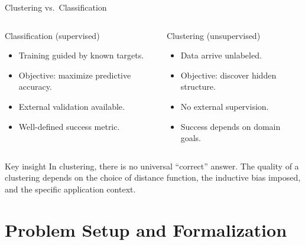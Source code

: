 \begin{frame}{Clustering vs.\ Classification}
  \begin{columns}[t]
      \begin{block}{Classification (supervised)}
        \begin{itemize}
          \item Training guided by \alert{known targets}.
          \item Objective: maximize predictive accuracy.
          \item External validation available.
          \item Well-defined success metric.
        \end{itemize}
      \end{block}
      \begin{block}{Clustering (unsupervised)}
        \begin{itemize}
          \item Data arrive \alert{unlabeled}.
          \item Objective: discover hidden structure.
          \item No external supervision.
          \item Success depends on domain goals.
        \end{itemize}
      \end{block}
  \end{columns}
  \vspace{0.6em}
  \begin{alertblock}{Key insight}
    In clustering, there is no universal ``correct'' answer. The quality of a clustering
    depends on the choice of distance function, the inductive bias imposed, and the
    specific application context.
  \end{alertblock}
\end{frame}

\section{Problem Setup and Formalization}

